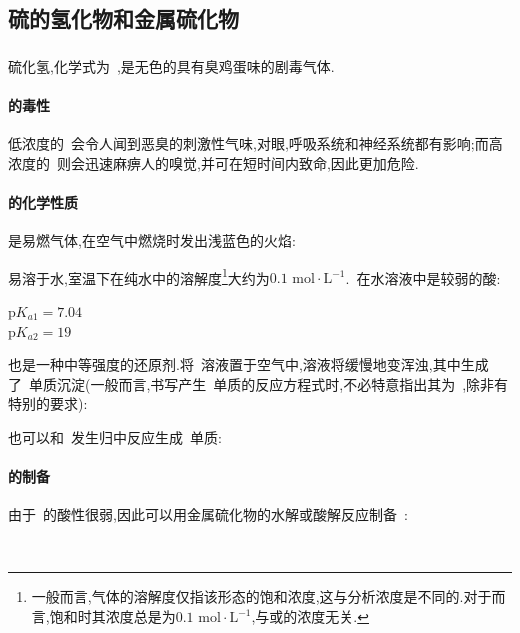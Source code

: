 \documentclass{ctexbook}
\begin{document}
\subsection{硫的氢化物和金属硫化物}
\subsubsection{}
硫化氢,化学式为~,是无色的具有臭鸡蛋味的剧毒气体.
\paragraph{的毒性}
低浓度的~会令人闻到恶臭的刺激性气味,对眼,呼吸系统和神经系统都有影响;而高浓度的~则会迅速麻痹人的嗅觉,并可在短时间内致命,因此更加危险.
\paragraph{的化学性质}
是易燃气体,在空气中燃烧时发出浅蓝色的火焰:
\begin{tightcenter}
\end{tightcenter}
\indent {}易溶于水,室温下在纯水中的溶解度\footnote{一般而言,气体的溶解度仅指该形态的饱和浓度,这与分析浓度是不同的.对于而言,饱和时其浓度总是为$0.1\text{ mol}\cdot\text{L}^{-1}$,与或的浓度无关.}大约为$0.1\text{ mol}\cdot\text{L}^{-1}$.~在水溶液中是较弱的酸:
\begin{tightcenter}
    \quad$\text{p}K_{a1}=7.04$\\
    \quad$\text{p}K_{a2}=19$
\end{tightcenter}
\indent {}也是一种中等强度的还原剂.将~溶液置于空气中,溶液将缓慢地变浑浊,其中生成了~单质沉淀(一般而言,书写产生~单质的反应方程式时,不必特意指出其为~,除非有特别的要求):
\begin{tightcenter}
\end{tightcenter}
也可以和~发生归中反应生成~单质:
\begin{tightcenter}
\end{tightcenter}
\paragraph{的制备}
由于~的酸性很弱,因此可以用金属硫化物的水解或酸解反应制备~:
\begin{tightcenter}
    \\
\end{tightcenter}
\end{document}

